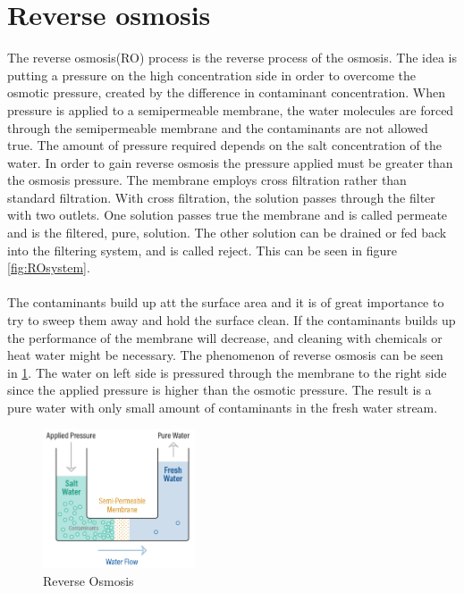\section{Reverse osmosis}
\label{RO}
The reverse osmosis(RO) process is the reverse process of the osmosis. The idea is putting a pressure on the high concentration side in order to overcome the osmotic pressure, created by the difference in contaminant concentration. When pressure is applied to a semipermeable membrane, the water molecules are forced through the semipermeable membrane and the contaminants are not allowed true. The amount of pressure required depends on the salt concentration of the water. In order to gain reverse osmosis the pressure applied must be greater than the osmosis pressure. The membrane employs cross filtration rather than standard filtration. With cross filtration, the solution passes through the filter with two outlets. One solution passes true the membrane and is called permeate and is the filtered, pure, solution. The other solution can be drained or fed back into the filtering system, and is called reject. This can be seen in figure \ref{fig:ROsystem}. \\
\\
The contaminants build up att the surface area and it is of great importance to try to sweep them away and hold the surface clean. If the contaminants builds up the performance of the membrane will decrease, and cleaning with chemicals or heat water might be necessary\cite{Puretech}. The phenomenon of reverse osmosis can be seen in \ref{fig:ReverseOsmosis}. The water on left side is pressured through the membrane to the right side since the applied pressure is higher than the osmotic pressure. The result is a pure water with only small amount of contaminants in the fresh water stream. 
\begin{figure}[h]
    \centering
    \includegraphics[width=0.4\textwidth]{ReverseOsmosis}
    \caption{Reverse Osmosis}
    \label{fig:ReverseOsmosis}
\end{figure}


